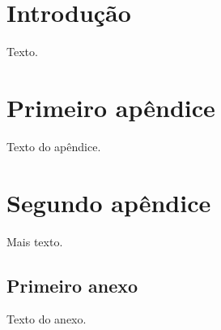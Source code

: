 \documentclass{abntex2-ufv}
\begin{document}
\textual
\chapter{Introdução}
Texto.
\begin{apendicesenv}
\partapendices
\chapter{Primeiro apêndice}
Texto do apêndice.
\chapter{Segundo apêndice}
Mais texto.
\end{apendicesenv}
\begin{anexosenv}
\partanexos
\chapter{Primeiro anexo}
Texto do anexo.
\end{anexosenv}
\end{document}

